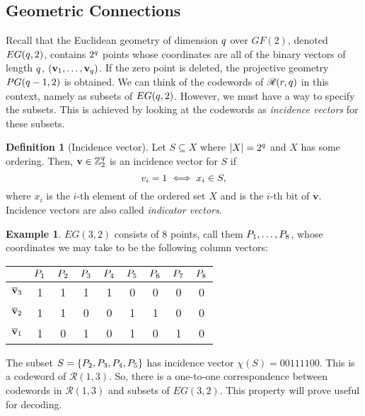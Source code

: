 \documentclass[12pt,twoside]{reedthesis}
\theoremstyle{definition}
\newtheorem{definition}[theorem]{Definition}
\newtheorem{example}[theorem]{Example}
\newcommand{\Z}{\mathbb{Z}}
\begin{document}
\subsection{Geometric Connections}
Recall that the Euclidean geometry of dimension $q$ over $GF(2)$, denoted $EG(q,2)$, contains $2^q$ points whose coordinates are all of the binary vectors of length $q$, $(\mathbf{v}_{1}, \ldots, \mathbf{v}_{q})$. If the zero point is deleted, the projective geometry $PG(q-1, 2)$ is obtained. We can think of the codewords of $\mathscr{R}(r,q)$ in this context, namely as subsets of $EG(q,2)$. However, we must have a way to specify the subsets. This is achieved by looking at the codewords as \textit{incidence vectors} for these subsets.

\begin{definition}[Incidence vector] Let $S \subseteq X$ where $\lvert X \rvert = 2^q$ and $X$ has some ordering. Then, $\mathbf{v} \in \Z_2^\numin$ is an incidence vector for $S$ if
\begin{equation*}
v_{i} = 1 \iff x_i \in S,
\end{equation*}
where $x_i$ is the $i$-th element of the ordered set $X$ and  is the $i$-th bit of $\mathbf{v}$. Incidence vectors are also called \textit{indicator vectors}.
\end{definition}

\begin{example}
$EG(3,2)$ consists of 8 points, call them $P_{1}, \ldots, P_{8}$, whose coordinates we may take to be the following column vectors:
\begin{center}
\begin{tabular}{ c | c c c c c c c c }
 & $P_{1}$ & $P_{2}$ & $P_{3}$ &$ P_{4}$ &$ P_{5}$ &$ P_{6} $& $P_{7}$ & $P_{8}$ \\
 \hline
 $\overline{\mathbf{v}}_{3}$ & 1 & 1 & 1 & 1 & 0 & 0 & 0 & 0\\ 
 $\overline{\mathbf{v}}_{2}$ & 1 & 1 & 0 & 0 & 1 & 1 & 0 & 0\\
$\overline{\mathbf{v}}_{1}$ & 1 & 0 & 1 & 0 & 1 & 0 & 1 & 0 
\end{tabular}
\end{center}

The subset $S = \{P_{2}, P_{3}, P_{4}, P_{5}\}$ has incidence vector $\chi(S) = 00111100$. This is a codeword of $\mathscr{R}(1,3)$. So, there is a one-to-one correspondence between codewords in $\mathscr{R}(1,3)$ and subsets of $EG(3,2)$. This property will prove useful for decoding.
\end{example}
\end{document}
